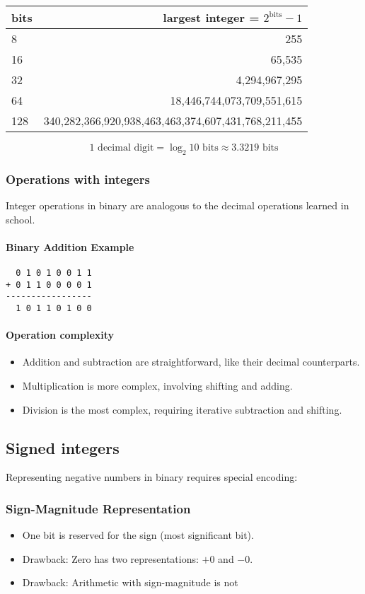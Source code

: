 \documentclass[12pt]{article}
\begin{document}
\begin{tabular}{lr}
\textbf{bits} & \textbf{largest integer = $2^{\text{bits}} - 1$} \\
\hline
8  & 255 \\
16 & 65,535 \\
32 & 4,294,967,295 \\
64 & 18,446,744,073,709,551,615 \\
128 & 340,282,366,920,938,463,463,374,607,431,768,211,455 \\
\end{tabular}



\[
\text{1 decimal digit} = \log_{2}{10} \text{ bits} \approx 3.3219 \text{ bits}
\]


\subsubsection{Operations with integers}
Integer operations in binary are analogous to the decimal operations learned in school.

\paragraph{Binary Addition Example}
\begin{lstlisting}
  0 1 0 1 0 0 1 1
+ 0 1 1 0 0 0 0 1
-----------------
  1 0 1 1 0 1 0 0
\end{lstlisting}

\paragraph{Operation complexity}
\begin{itemize}
    \item Addition and subtraction are straightforward, like their decimal counterparts.
    \item Multiplication is more complex, involving shifting and adding.
    \item Division is the most complex, requiring iterative subtraction and shifting.
\end{itemize}

\subsection{Signed integers}
Representing negative numbers in binary requires special encoding:
\subsubsection{Sign-Magnitude Representation}
\begin{itemize}
    \item One bit is reserved for the sign (most significant bit).
    \item Drawback: Zero has two representations: $+0$ and $-0$.
    \item Drawback: Arithmetic with sign-magnitude is not
\end{itemize}
\end{document}

